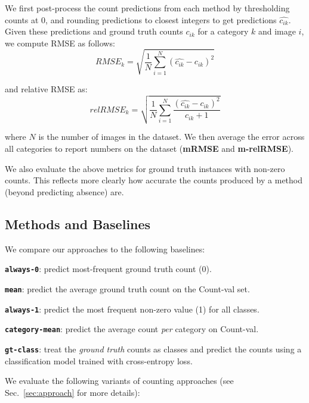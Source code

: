 \documentclass[10pt,twocolumn,letterpaper]{article}
\newcommand{\refsec}[1]{Sec.~\ref{#1}}
\begin{document}
We first post-process the count predictions from each method by thresholding counts at 0, and rounding predictions to closest integers to get predictions $\hat{c_{ik}}$. Given these predictions and ground truth counts $c_{ik}$ for a category $k$ and image $i$, we compute RMSE as follows:
\vspace{-5pt}
\begin{equation}
RMSE_{k} = \sqrt{\frac{1}{N}\sum_{i=1}^{N}(\hat{c_{ik}}-c_{ik})^2}
\end{equation}

and relative RMSE as:
\vspace{-5pt}
\begin{equation}
relRMSE_{k} = \sqrt{\frac{1}{N}\sum_{i=1}^{N}\frac{(\hat{c_{ik}}-c_{ik})^2}{c_{ik}+1}}
\end{equation}


where $N$ is the number of images in the dataset. We then average the error across all categories to report numbers on the dataset (\textbf{mRMSE} and \textbf{m-relRMSE}). 


We also evaluate the above metrics for ground truth instances with non-zero counts. This reflects more clearly how accurate the counts produced by a method (beyond predicting absence) are. 



\subsection{Methods and Baselines}
We compare our approaches to the following baselines:

\noindent \textbf{\texttt{always-0}}: predict most-frequent ground truth count (0).

\noindent \textbf{\texttt{mean}}: predict the average ground truth count on the Count-val set.

\noindent \textbf{\texttt{always-1}}: predict the most frequent non-zero value (1) for all classes.

\noindent \textbf{\texttt{category-mean}}: predict the average count \emph{per} category on Count-val.

\noindent \textbf{\texttt{gt-class}}: treat the \emph{ground truth} counts as classes and predict the counts using a classification model trained with cross-entropy loss.




We evaluate the following variants of counting approaches (see \refsec{sec:approach} for more details):
\end{document}
